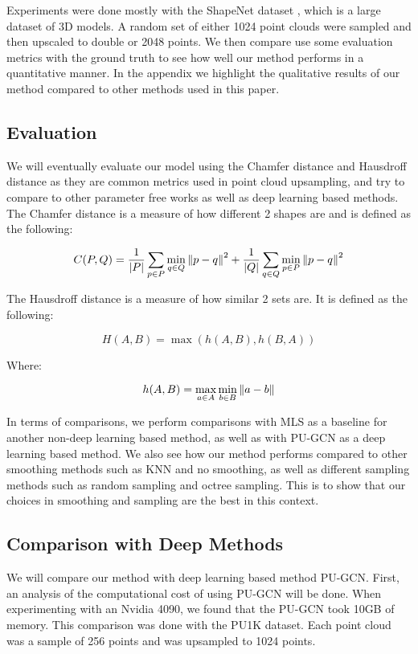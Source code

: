 Experiments were done mostly with the ShapeNet dataset \cite{shapenet}, which is a large dataset of 3D models. 
A random set of either 1024 point clouds were sampled and then upscaled to double or 2048 points.
We then compare use some evaluation metrics with the ground truth to see how well our method performs in a quantitative manner.
In the appendix we highlight the qualitative results of our method compared to other methods used in this paper.


\subsection{Evaluation}

We will eventually evaluate our model using the Chamfer distance and Hausdroff distance as they are common metrics used in point cloud upsampling, and try to compare to other parameter free works as well as deep learning based methods.
The Chamfer distance is a measure of how different 2 shapes are and is defined as the following:

$$ C(P, Q) = \dfrac{1}{|P|} \sum\limits_{p \in P} \min_{q \in Q} \left\lVert p - q\right\rVert^2 +  \dfrac{1}{|Q|} \sum\limits_{q \in Q} \min_{p \in P} \left\lVert p - q\right\rVert^2 \label{eq:chamfer}$$

The Hausdroff distance is a measure of how similar 2 sets are. It is defined as the following:

$$ H(A, B) = \max(h(A, B), h(B, A))\label{eq:hausdroff}$$

Where:

$$h(A, B) = \max_{a \in A} \min_{b \in B} \left\lVert a - b\right\rVert$$

In terms of comparisons, we perform comparisons with MLS as a baseline for another non-deep learning based method, as well as with PU-GCN as a deep learning based method.
We also see how our method performs compared to other smoothing methods such as KNN and no smoothing, as well as different sampling methods such as random sampling and octree sampling.
This is to show that our choices in smoothing and sampling are the best in this context.

\subsection{Comparison with Deep Methods}

We will compare our method with deep learning based method PU-GCN\cite{PU-GCN}.
First, an analysis of the computational cost of using PU-GCN will be done. 
When experimenting with an Nvidia 4090, we found that the PU-GCN took 10GB of memory.
This comparison was done with the PU1K dataset. Each point cloud was a sample of 256 points and was upsampled to 1024 points. 


